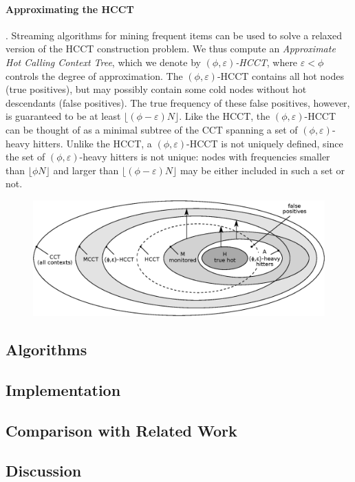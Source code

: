 \paragraph*{Approximating the HCCT}. Streaming algorithms for mining frequent items can be used to solve a relaxed version of the HCCT construction problem. We thus compute an {\em Approximate Hot Calling Context Tree}, which we denote by {\em $(\phi,\varepsilon)$-HCCT}, where $\varepsilon<\phi$ controls the degree of approximation. The $(\phi,\varepsilon)$-HCCT contains all hot nodes (true positives), but may possibly contain some cold nodes without hot descendants (false positives). The true frequency of these false positives, however, is guaranteed to be at least $\lfloor(\phi-\varepsilon) N\rfloor$. Like the HCCT, the $(\phi,\varepsilon)$-HCCT can be thought of as a minimal subtree of the CCT spanning a set of $(\phi,\varepsilon)$-heavy hitters. Unlike the HCCT, a $(\phi,\varepsilon)$-HCCT is not uniquely defined, since the set of $(\phi,\varepsilon)$-heavy hitters is not unique: nodes with frequencies smaller than $\lfloor\phi N\rfloor$ and larger than $\lfloor(\phi-\varepsilon) N\rfloor$ may be either included in such a set or not.

\ifdefined\noauthorea
\begin{figure}[ht]
\begin{center}
\includegraphics[width=0.95\columnwidth]{figures/hcct-venn/hcct-venn.eps}
\caption{\protect}
\end{center}
\end{figure}
\fi 

\subsection{Algorithms}

\subsection{Implementation}

\subsection{Comparison with Related Work}

\subsection{Discussion}

